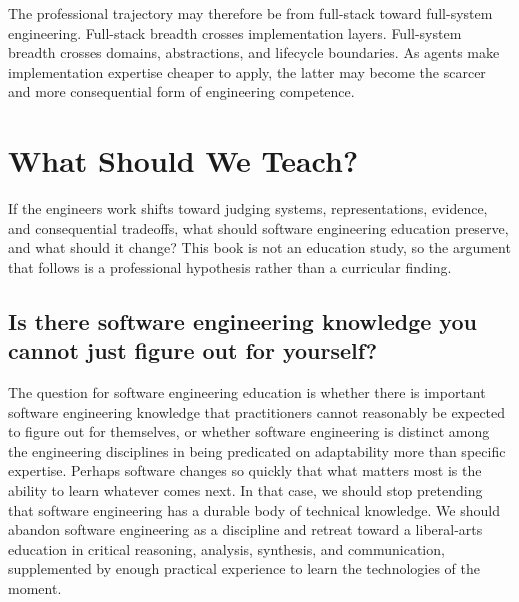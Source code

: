 
The professional trajectory may therefore be from full-stack toward full-system engineering. Full-stack breadth crosses implementation layers. Full-system breadth crosses domains, abstractions, and lifecycle boundaries. As agents make implementation expertise cheaper to apply, the latter may become the scarcer and more consequential form of engineering competence.

\section{What Should We Teach?}\label{heading:what-should-we-teach}


If the engineer\textquotesingle s work shifts toward judging systems, representations, evidence, and consequential tradeoffs, what should software engineering education preserve, and what should it change? This book is not an education study, so the argument that follows is a professional hypothesis rather than a curricular finding.

\subsection{Is there software engineering knowledge you cannot just figure out for yourself?}\label{heading:is-there-software-engineering-knowledge-you-cannot-just-figure-out-for-yourself}


The question for software engineering education is whether there is important software engineering knowledge that practitioners cannot reasonably be expected to figure out for themselves, or whether software engineering is distinct among the engineering disciplines in being predicated on adaptability more than specific expertise. Perhaps software changes so quickly that what matters most is the ability to learn whatever comes next. In that case, we should stop pretending that software engineering has a durable body of technical knowledge. We should abandon software engineering as a discipline and retreat toward a liberal-arts education in critical reasoning, analysis, synthesis, and communication, supplemented by enough practical experience to learn the technologies of the moment.

